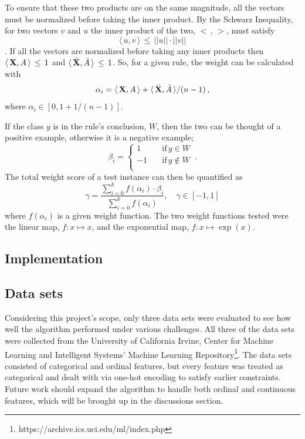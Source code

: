 \documentclass[10pt]{article}
\begin{document}
To ensure that these two products are on the same magnitude, all the vectors must be normalized before taking the inner product. By the Schwarz Inequality, for two vectors $v$ and $u$ the inner product of the two, $< \, , \, >$, must satisfy 
\[\langle \,u, v \, \rangle \, \leq \,  ||u|| \cdot ||v||\]
\citep{strang2006linear}. If all the vectors are normalized before taking any inner products then $\langle \,\vb{X}, A \, \rangle \,\leq\, 1$ and $\langle \, \bar{\vb{X}}, \bar{A} \, \rangle \, \leq \, 1$. So, for a given rule, the weight can be calculated with 
\[\alpha_i = \langle \,\vb{X}, A \, \rangle + \langle \, \bar{\vb{X}}, \bar{A} \, \rangle / (n-1) \, ,\]
where $\alpha_i \in [0, 1+ 1/(n-1)]$.

If the class $y$ is in the rule's conclusion, $W$, then the two can be thought of a positive example, otherwise it is a negative example;
\begin{equation*}
\beta_i=\begin{cases}
          1 \quad &\text{if} \, y \in W \\
          -1 \quad &\text{if} \, y \notin W\\
     \end{cases} \, .
\end{equation*}
The total weight score of a test instance can then be quantified as 
\begin{equation}
\gamma = \frac{\sum\limits_{i=0}^k f(\alpha_i) \cdot \beta_i}{\sum\limits_{i=0}^k f(\alpha_i)},  \quad \gamma \in [-1, 1]
\label{eq:rule_meas}
\end{equation}
where $f(\alpha_i)$ is a given weight function. The two weight functions tested were the linear map, $f: x\mapsto x$, and the exponential map, $f: x\mapsto \exp(x)$. 


\subsection{Implementation}

\subsection{Data sets}
Considering this project's scope, only three data sets were evaluated to see how well the algorithm performed under various challenges. All three of the data sets were collected from the University of California Irvine, Center for Machine Learning and Intelligent Systems' Machine Learning Repository\footnote{https://archive.ics.uci.edu/ml/index.php}. The data sets consisted of categorical and ordinal features, but every feature was treated as categorical and dealt with via one-hot encoding to satisfy earlier constraints. Future work should expand the algorithm to handle both ordinal and continuous features, which will be brought up in the discussions section.
\end{document}
